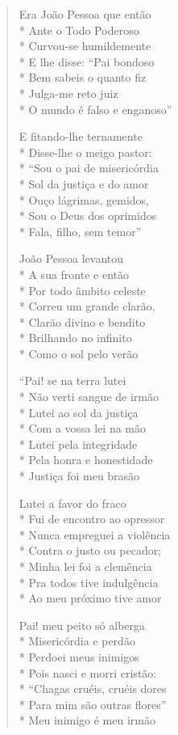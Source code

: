 \begin{verse}
Era João Pessoa que então\\*
Ante o Todo Poderoso\\*
Curvou-se humildemente\\*
E lhe disse: ``Pai bondoso\\*
Bem sabeis o quanto fiz\\*
Julga-me reto juiz\\*
O mundo é falso e enganoso''

E fitando-lhe ternamente\\*
Disse-lhe o meigo pastor:\\*
``Sou o pai de misericórdia\\*
Sol da justiça e do amor\\*
Ouço lágrimas, gemidos,\\*
Sou o Deus dos oprimidos\\*
Fala, filho, sem temor''

João Pessoa levantou\\*
A sua fronte e então\\*
Por todo âmbito celeste\\*
Correu um grande clarão,\\*
Clarão divino e bendito\\*
Brilhando no infinito\\*
Como o sol pelo verão

``Pai! se na terra lutei\\*
Não verti sangue de irmão\\*
Lutei ao sol da justiça\\*
Com a vossa lei na mão\\*
Lutei pela integridade\\*
Pela honra e honestidade\\*
Justiça foi meu brasão

Lutei a favor do fraco\\*
Fui de encontro ao opressor\\*
Nunca empreguei a violência\\*
Contra o justo ou pecador;\\*
Minha lei foi a clemência\\*
Pra todos tive indulgência\\*
Ao meu próximo tive amor

Pai! meu peito só alberga\\*
Misericórdia e perdão\\*
Perdoei meus inimigos\\*
Pois nasci e morri cristão:\\*
``Chagas cruéis, cruéis dores\\*
Para mim são outras flores''\\*
Meu inimigo é meu irmão


\end{verse}
